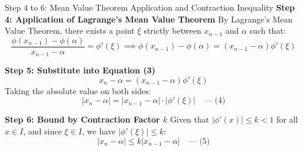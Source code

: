 \documentclass[11pt,a4paper]{article}
\begin{document}
\newpage

\begin{exbox}{Step 4 to 6: Mean Value Theorem Application and Contraction Inequality}
\textbf{Step 4: Application of Lagrange's Mean Value Theorem}
By Lagrange's Mean Value Theorem, there exists a point $\xi$ strictly between $x_{n-1}$ and $\alpha$ such that:
\begin{equation}
    \frac{\phi(x_{n-1}) - \phi(\alpha)}{x_{n-1} - \alpha} = \phi'(\xi) \implies \phi(x_{n-1}) - \phi(\alpha) = (x_{n-1} - \alpha)\phi'(\xi)
\end{equation}

\textbf{Step 5: Substitute into Equation (3)}
\begin{equation}
    x_n - \alpha = (x_{n-1} - \alpha)\phi'(\xi)
\end{equation}
Taking the absolute value on both sides:
\begin{equation}
    |x_n - \alpha| = |x_{n-1} - \alpha| \cdot |\phi'(\xi)| \quad \text{--- (4)}
\end{equation}

\textbf{Step 6: Bound by Contraction Factor $k$}
Given that $|\phi'(x)| \le k < 1$ for all $x \in I$, and since $\xi \in I$, we have $|\phi'(\xi)| \le k$:
\begin{equation}
    |x_n - \alpha| \le k |x_{n-1} - \alpha| \quad \text{--- (5)}
\end{equation}
\end{exbox}
\end{document}
